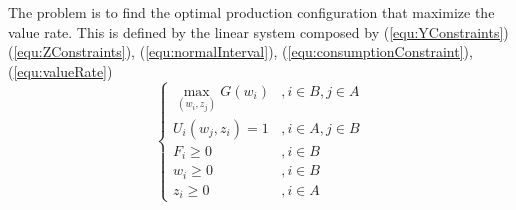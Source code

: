 \documentclass[a4paper,11pt]{article}
\begin{document}
The problem is to find the optimal production configuration that maximize the value rate. This is defined by the linear system composed by
(\ref{equ:YConstraints})
(\ref{equ:ZConstraints}),
(\ref{equ:normalInterval}),
(\ref{equ:consumptionConstraint}),
(\ref{equ:valueRate})
\[
\left\{
\begin{array}{ll}
	\max_{(w_i, z_j)} G(w_i) & , i \in B, j \in A \\
	U_i(w_j, z_i) = 1 &  , i \in A, j \in B \\
	F_i \ge 0 & , i \in B \\
	w_i \ge 0 & , i \in B \\
	z_i \ge 0 & , i \in A
\end{array}
\right.
\]
\end{document}
